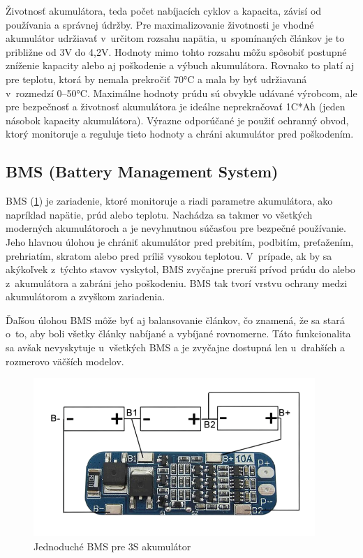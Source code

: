 Životnosť akumulátora, teda počet nabíjacích cyklov a kapacita, závisí od používania a správnej údržby.
Pre maximalizovanie životnosti je vhodné akumulátor udržiavať v~určitom rozsahu napätia, u~spomínaných článkov je to približne od 3V do 4,2V.
Hodnoty mimo tohto rozsahu môžu spôsobiť postupné zníženie kapacity alebo aj poškodenie a výbuch akumulátora.
Rovnako to platí aj pre teplotu, ktorá by nemala prekročiť 70°C a mala by byť udržiavaná v~rozmedzí 0--50°C.
Maximálne hodnoty prúdu sú obvykle udávané výrobcom, ale pre bezpečnosť a životnosť akumulátora je ideálne neprekračovať 1C*Ah (jeden násobok kapacity akumulátora).
Výrazne odporúčané je použiť ochranný obvod, ktorý monitoruje a reguluje tieto hodnoty a chráni akumulátor pred poškodením.\cite{BatterySpace}

\subsection{BMS (Battery Management System)}
BMS (\ref{fig:bms}) je zariadenie, ktoré monitoruje a riadi parametre akumulátora, ako napríklad napätie, prúd alebo teplotu.
Nachádza sa takmer vo všetkých moderných akumulátoroch a je nevyhnutnou súčasťou pre bezpečné používanie.
Jeho hlavnou úlohou je chrániť akumulátor pred prebitím, podbitím, preťažením, prehriatím, skratom alebo pred príliš vysokou teplotou.
V~prípade, ak by sa akýkoľvek z~týchto stavov vyskytol, BMS zvyčajne preruší prívod prúdu do alebo z~akumulátora a zabráni jeho poškodeniu.
BMS tak tvorí vrstvu ochrany medzi akumulátorom a zvyškom zariadenia.

Ďaľšou úlohou BMS môže byť aj balansovanie článkov, čo znamená, že sa stará o~to, aby boli všetky články nabíjané a vybíjané rovnomerne.
Táto funkcionalita sa avšak nevyskytuje u~všetkých BMS a je zvyčajne dostupná len u~drahších a rozmerovo väčších modelov.\cite{Bergveld}

\begin{figure}[h]
    \centering
    \includegraphics[height=6cm]{obrazky-figures/bms.png}
    \caption{Jednoduché BMS pre 3S akumulátor\cite{CampusComponent}}\label{fig:bms}
\end{figure}

